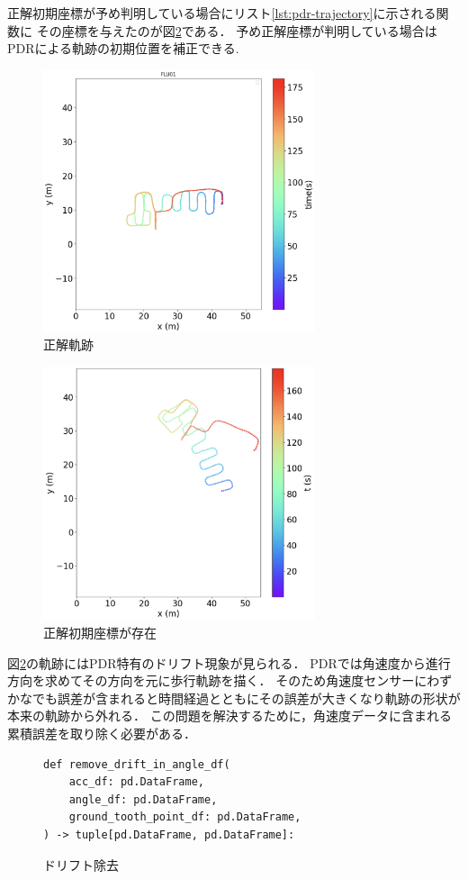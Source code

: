 \documentclass[Japanese]{dicomopapers}
\begin{document}
正解初期座標が予め判明している場合にリスト\ref{lst:pdr-trajectory}に示される関数に
その座標を与えたのが図\ref{fig:pdr-move}である．
予め正解座標が判明している場合はPDRによる軌跡の初期位置を補正できる.

\begin{figure}[h]
	\centering
	\includegraphics[width=80mm]{image/gt2.jpg}
	\caption{正解軌跡}    \label{fig:gt-trajectory}
\end{figure}

\begin{figure}[h]
	\centering
	\includegraphics[width=80mm]{image/pdr-move.jpg}
	\caption{正解初期座標が存在}    \label{fig:pdr-move}
\end{figure}


図\ref{fig:pdr-move}の軌跡にはPDR特有のドリフト現象が見られる．
PDRでは角速度から進行方向を求めてその方向を元に歩行軌跡を描く．
そのため角速度センサーにわずかなでも誤差が含まれると時間経過とともにその誤差が大きくなり軌跡の形状が本来の軌跡から外れる．
この問題を解決するために，角速度データに含まれる累積誤差を取り除く必要がある．


\begin{figure}[ht]
	\begin{lstlisting}
def remove_drift_in_angle_df(
    acc_df: pd.DataFrame,
    angle_df: pd.DataFrame,
    ground_tooth_point_df: pd.DataFrame,
) -> tuple[pd.DataFrame, pd.DataFrame]:
\end{lstlisting}
	\caption{ドリフト除去}
	\label{lst:remove-drift}
\end{figure}
\end{document}
